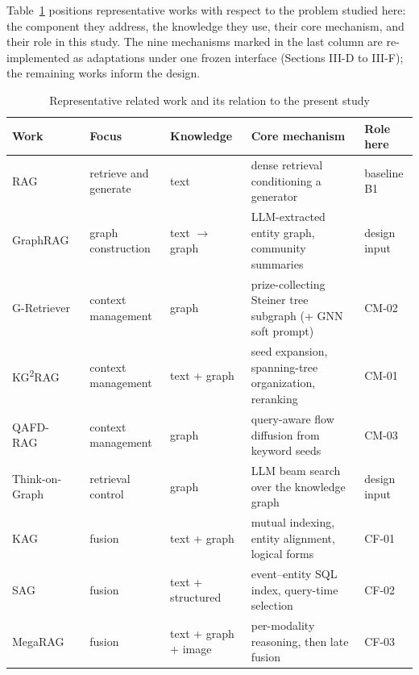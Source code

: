 \documentclass[conference]{IEEEtran}
\begin{document}
Table~\ref{tab:lit} positions representative works with respect to the problem studied here: the component they address, the knowledge they use, their core mechanism, and their role in this study. The nine mechanisms marked in the last column are re-implemented as adaptations under one frozen interface (Sections III-D to III-F); the remaining works inform the design.

\begin{table}[!t]
\caption{Representative related work and its relation to the present study}
\label{tab:lit}
\centering
\footnotesize
\setlength{\tabcolsep}{3pt}
\renewcommand{\arraystretch}{1.1}
\begin{tabular}{@{}>{\raggedright\arraybackslash}p{}>{\raggedright\arraybackslash}p{}>{\raggedright\arraybackslash}p{}>{\raggedright\arraybackslash}p{}>{\raggedright\arraybackslash}p{}@{}}
\toprule
\textbf{Work} & \textbf{Focus} & \textbf{Knowledge} & \textbf{Core mechanism} & \textbf{Role here} \\
\midrule
RAG~\cite{lewis2020} & retrieve and generate & text & dense retrieval conditioning a generator & baseline B1 \\
GraphRAG~\cite{edge2024graphrag} & graph construction & text $\rightarrow$ graph & LLM-extracted entity graph, community summaries & design input \\
G-Retriever~\cite{he2024gretriever} & context management & graph & prize-collecting Steiner tree subgraph (+ GNN soft prompt) & CM-02 \\
KG\textsuperscript{2}RAG~\cite{zhu2025kg2rag} & context management & text + graph & seed expansion, spanning-tree organization, reranking & CM-01 \\
QAFD-RAG~\cite{zhou2026qafd} & context management & graph & query-aware flow diffusion from keyword seeds & CM-03 \\
Think-on-Graph~\cite{sun2024tog} & retrieval control & graph & LLM beam search over the knowledge graph & design input \\
KAG~\cite{liang2024kag} & fusion & text + graph & mutual indexing, entity alignment, logical forms & CF-01 \\
SAG~\cite{wu2026sag} & fusion & text + structured & event--entity SQL index, query-time selection & CF-02 \\
MegaRAG~\cite{hsiao2025megarag} & fusion & text + graph + image & per-modality reasoning, then late fusion & CF-03 \\

\end{tabular}
\end{table}
\end{document}
